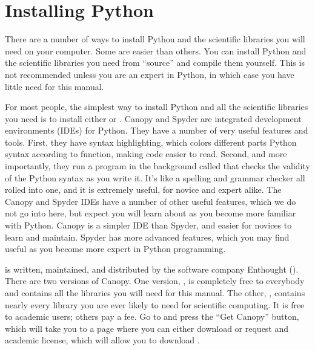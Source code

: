 \documentclass[letterpaper,10pt,english]{sphinxmanual}
\begin{document}
\section{Installing Python}
\label{\detokenize{apdx1/apdx1_install:id1}}
\sphinxAtStartPar
There are a number of ways to install Python and the scientific libraries you will need on your computer.  Some are easier than others.  You can install Python and the scientific libraries you need from “source” and compile them yourself.  This is not recommended unless you are an expert in Python, in which case you have little need for this manual.

\ignorespaces 
\sphinxAtStartPar
For most people, the simplest way to install Python and all the scientific libraries you need is to install either  or .  Canopy and Spyder are integrated development environments (IDEs) for Python.  They have a number of very useful features and tools.  First, they have syntax highlighting, which colors different parts Python syntax according to function, making code easier to read.  Second, and more importantly, they run a program in the background called  that checks the validity of the Python syntax as you write it.  It’s like a spelling and grammar checker all rolled into one, and it is extremely useful, for novice and expert alike.  The Canopy and Spyder IDEs have a number of other useful features, which we do not go into here, but expect you will learn about as you become more familiar with Python.  Canopy is a simpler IDE than Spyder, and easier for novices to learn and maintain.  Spyder has more advanced features, which you may find useful as you become more expert in Python programming.

\sphinxAtStartPar
{} is written, maintained, and distributed by the software company Enthought ().  There are two versions of Canopy.  One version, , is completely free to everybody and contains all the libraries you will need for this manual.  The other, , contains nearly every library you are ever likely to need for scientific computing.  It is free to academic users; others pay a fee.  Go to  and press the “Get Canopy” button, which will take you to a page where you can either download  or request and academic license, which will allow you to download .
\end{document}
